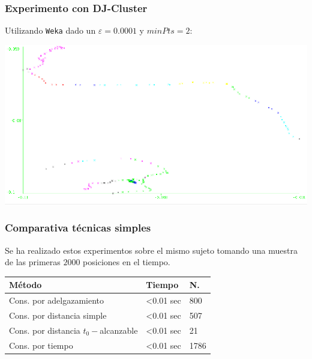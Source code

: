 \documentclass[10pt, spanish]{beamer}
\begin{document}
\begin{frame}[fragile]
\frametitle{Experimento con DJ-Cluster}
Utilizando \texttt{Weka} dado un $\varepsilon=0.0001$ y $minPts = 2$:\\

\begin{center}
	\includegraphics[scale=.43]{djClusterSujeto1.png}
\end{center}

\end{frame}




\begin{frame}[fragile]
\frametitle{Comparativa t\'ecnicas simples}

Se ha realizado estos experimentos sobre el mismo sujeto tomando una muestra de las primeras $2000$ posiciones en el tiempo.\\

\begin{center}
\begin{tabular}{|l|l|l|}
	\hline
	\rowcolor{Gray}
	M\'etodo & Tiempo & N. \\
	\hline	
	Cons. por adelgazamiento &  <0.01 sec & 800 \\
	\hline 
	Cons. por distancia simple &  <0.01 sec & 507 \\
	\hline
	Cons. por distancia $t_0-$alcanzable  &  <0.01 sec  & 21\\
	\hline
	Cons. por tiempo &  <0.01 sec  & 1786\\
	\hline
\end{tabular}
\end{center}

\end{frame}
\end{document}
